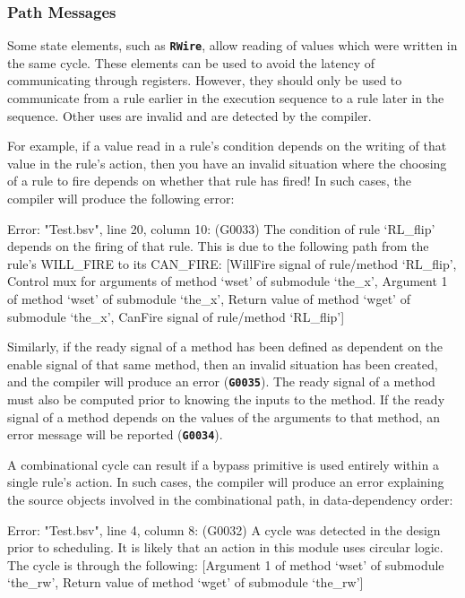 \documentclass{article}
\newenvironment{centerboxverbatim}
  {\center
   \boxedverbatim}
  {\endboxedverbatim
  {\endcenter }}
\begin{document}

\subsubsection{Path Messages}
\label{path-msgs}

Some state elements, such as {\bf\tt RWire}, allow reading of values
which were written in the same cycle.  These elements can be used to
avoid the latency of communicating through registers.  However, they
should only be used to communicate from a rule earlier in the execution
sequence to a rule later in the sequence.  Other uses are invalid
and are detected by the compiler.

For example, if a value read in a rule's condition depends on the
writing of that value in the rule's action, then you have an invalid
situation where the choosing of a rule to fire depends on whether that
rule has fired!  In such cases, the compiler will produce the following
error:

\begin{centerboxverbatim}
Error: "Test.bsv", line 20, column 10: (G0033)
  The condition of rule `RL_flip' depends on the firing of that rule. This is
  due to the following path from the rule's WILL_FIRE to its CAN_FIRE:
    [WillFire signal of rule/method `RL_flip',
     Control mux for arguments of method `wset' of submodule `the_x',
     Argument 1 of method `wset' of submodule `the_x',
     Return value of method `wget' of submodule `the_x',
     CanFire signal of rule/method `RL_flip']
\end{centerboxverbatim}

Similarly, if the ready signal of a method has been defined as dependent
on the enable signal of that same method, then an invalid situation has
been created, and the compiler will produce an error ({\bf\tt G0035}).
The ready signal of a method must also be computed prior to knowing the
inputs to the method.  If the ready signal of a method depends on the
values of the arguments to that method, an error message will be
reported ({\bf\tt G0034}).

A combinational cycle can result if a bypass primitive is used
entirely within a single rule's action.  In such cases, the compiler
will produce an error explaining the source objects involved in the
combinational path, in data-dependency order:

\begin{centerboxverbatim}
Error: "Test.bsv", line 4, column 8: (G0032)
  A cycle was detected in the design prior to scheduling. It is likely that
  an action in this module uses circular logic. The cycle is through the
  following:
    [Argument 1 of method `wset' of submodule `the_rw',
     Return value of method `wget' of submodule `the_rw']
\end{centerboxverbatim}
\end{document}
